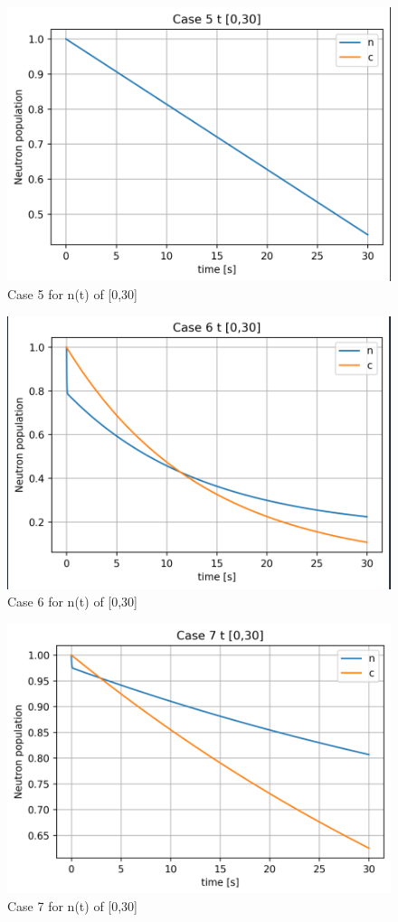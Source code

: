 \documentclass[12pt,fleqn, parskip=full]{scrartcl}
\begin{document}
\begin{figure}[H]
	\centering
	\includegraphics[scale=1]{Image_5_hw_4}
	\caption{Case 5 for n(t) of [0,30]}
\end{figure}

\begin{figure}[H]
	\centering
	\includegraphics[scale=1]{Image_6_hw_4}
	\caption{Case 6 for n(t) of [0,30]}
\end{figure}

\begin{figure}[H]
	\centering
	\includegraphics[scale=1]{Image_7_hw_4}
	\caption{Case 7 for n(t) of [0,30]}
\end{figure}
\end{document}
